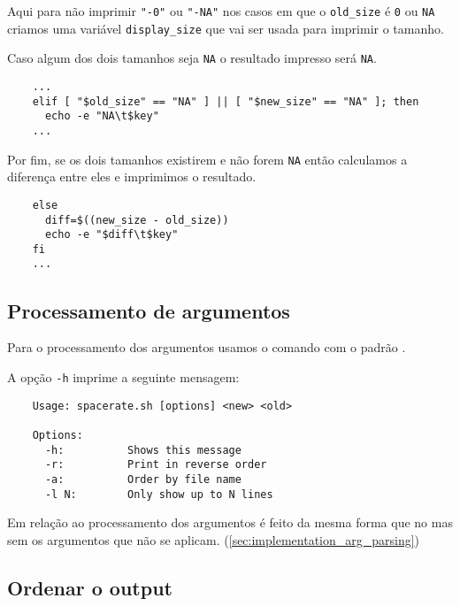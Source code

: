 Aqui para não imprimir \Verb|"-0"| ou \Verb|"-NA"| nos casos em que o \Verb|old_size| é \Verb|0| ou \Verb|NA| criamos uma variável \Verb|display_size| que vai ser usada para imprimir o tamanho.

Caso algum dos dois tamanhos seja \Verb|NA| o resultado impresso será \Verb|NA|.

\begin{listing}[H]
	\centering
	\begin{verbatim}
    ...
    elif [ "$old_size" == "NA" ] || [ "$new_size" == "NA" ]; then
      echo -e "NA\t$key"
    ...
  \end{verbatim}
\end{listing}

Por fim, se os dois tamanhos existirem e não forem \Verb|NA| então calculamos a diferença entre eles e imprimimos o resultado.

\begin{listing}[H]
	\centering
	\begin{verbatim}
    else
      diff=$((new_size - old_size))
      echo -e "$diff\t$key"
    fi
    ...
  \end{verbatim}
\end{listing}

\subsection{Processamento de argumentos}

Para o processamento dos argumentos usamos o comando  com o padrão .

A opção \Verb|-h| imprime a seguinte mensagem:

\begin{listing}[H]
	\centering
	\begin{verbatim}
    Usage: spacerate.sh [options] <new> <old>

    Options:
      -h:          Shows this message
      -r:          Print in reverse order
      -a:          Order by file name
      -l N:        Only show up to N lines
  \end{verbatim}
\end{listing}

Em relação ao processamento dos argumentos é feito da mesma forma que no  mas sem os argumentos que não se aplicam. (\ref{sec:implementation_arg_parsing})

\subsection{Ordenar o output}

